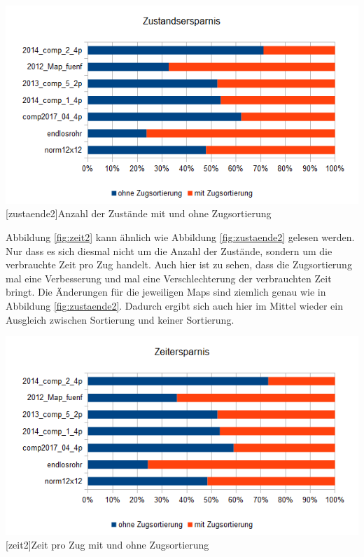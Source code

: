 \documentclass[12pt,a4paper,bibliography=totocnumbered,listof=totocnumbered]{scrartcl}
\begin{document}
    \vspace{1em}
    \begin{minipage}{\linewidth}
    	\centering
    	\includegraphics[width=0.9\linewidth]{pics/Kapitel_4/ZustandZugSort.png}
    	[zustaende2]{Anzahl der Zustände mit und ohne Zugsortierung}
    	\label{fig:zustaende2}
    \end{minipage}
    \vspace{1em}
    
    Abbildung \ref{fig:zeit2} kann ähnlich wie Abbildung \ref{fig:zustaende2} gelesen werden. Nur dass es sich diesmal nicht um die Anzahl der Zustände, sondern um die verbrauchte Zeit pro Zug handelt. Auch hier ist zu sehen, dass die Zugsortierung mal eine Verbesserung und mal eine Verschlechterung der verbrauchten Zeit bringt. Die Änderungen für die jeweiligen Maps sind ziemlich genau wie in Abbildung \ref{fig:zustaende2}. Dadurch ergibt sich auch hier im Mittel wieder ein Ausgleich zwischen Sortierung und keiner Sortierung.\newline
    
    
    \vspace{1em}
    \begin{minipage}{\linewidth}
    	\centering
    	\includegraphics[width=1\linewidth]{pics/Kapitel_4/ZeitZugSort.png}
    	[zeit2]{Zeit pro Zug mit und ohne Zugsortierung}
    	\label{fig:zeit2}
    \end{minipage}
    \vspace{1em}
    
\end{document}
